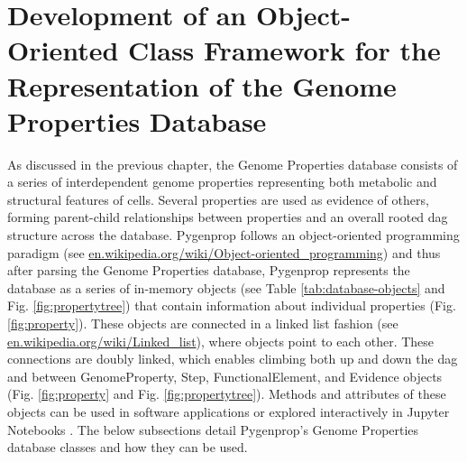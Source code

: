 \section{Development of an Object-Oriented Class Framework for the 
Representation of the Genome Properties Database} \label{genomeprop-oop}

As discussed in the previous chapter, the Genome Properties database consists of 
a series of interdependent genome properties representing both metabolic and 
structural features of cells. Several properties are used as evidence of others, 
forming parent-child relationships between properties and an overall rooted 
\gls{dag} structure across the database. Pygenprop follows an object-oriented 
programming paradigm \cite{booch1986object} (see 
\href{http://en.wikipedia.org/wiki/Object-oriented_programming}{en.wikipedia.org/wiki/Object-oriented\_programming}) 
and thus after parsing the Genome Properties database, Pygenprop represents the 
database as a series of in-memory objects (see Table \ref{tab:database-objects} 
and Fig. \ref{fig:propertytree}) that contain information about individual 
properties (Fig. \ref{fig:property}). These objects are connected in a linked 
list fashion \cite{newell1957programming} (see 
\href{http://en.wikipedia.org/wiki/Linked_list}{en.wikipedia.org/wiki/Linked\_list}), 
where objects point to each other. These connections are doubly linked, which 
enables climbing both up and down the \gls{dag} and between GenomeProperty, 
Step, FunctionalElement, and Evidence objects (Fig. \ref{fig:property} and Fig. 
\ref{fig:propertytree}). Methods and attributes of these objects can be used in 
software applications or explored interactively in Jupyter Notebooks 
\cite{kluyver2016jupyter}. The below subsections detail Pygenprop's Genome 
Properties database classes and how they can be used. 

